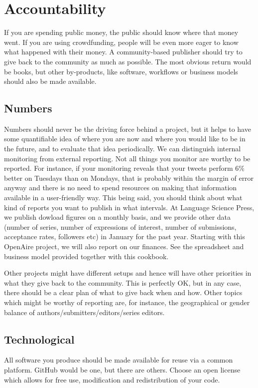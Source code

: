 \documentclass[nonflat,modfonts,output=book] {langsci/langscibook}
\begin{document}
            
\section{Accountability}\label{sec:accountability}
If you are spending public money, the public should know where that money went. If you are using crowdfunding, people will be even more eager to know what happened with their money. A community-based publisher should try to give back to the community as much as possible. The most obvious return would be books, but other by-products, like software, workflows or business models should also be made available. 

\subsection{Numbers}
Numbers should never be the driving force behind a project, but it helps to have some quantifiable idea of where you are now and where you would like to be in the future, and to evaluate that idea periodically. We can distinguish internal monitoring from external reporting. Not all things you monitor are worthy to be reported. For instance, if your monitoring reveals that your tweets perform 6\% better on Tuesdays than on Mondays, that is probably within the margin of error anyway and there is no need to spend resources on making that information available in a user-friendly way. This being said, you should think about what kind of reports you want to publish in what intervals. At Language Science Press, we publish dowload figures on a monthly basis, and we provide other data (number of series, number of expressions of interest, number of submissions, acceptance rates, followers etc) in January for the past year. Starting with this Open\-Aire project, we will also report on our finances. See the spreadsheet and business model provided together with this cookbook.

Other projects might have different setups and hence will have other priorities in what they give back to the community. This is perfectly OK, but in any case, there should be a clear plan of what to give back when and how. Other topics which might be worthy of reporting are, for instance, the geographical or gender balance of authors/submitters/editors/series editors.


\subsection{Technological}
All software you produce should be made available for reuse via a common platform. GitHub would be one, but there are others. Choose an open license which allows for free use, modification and redistribution of your code. 
\end{document}
